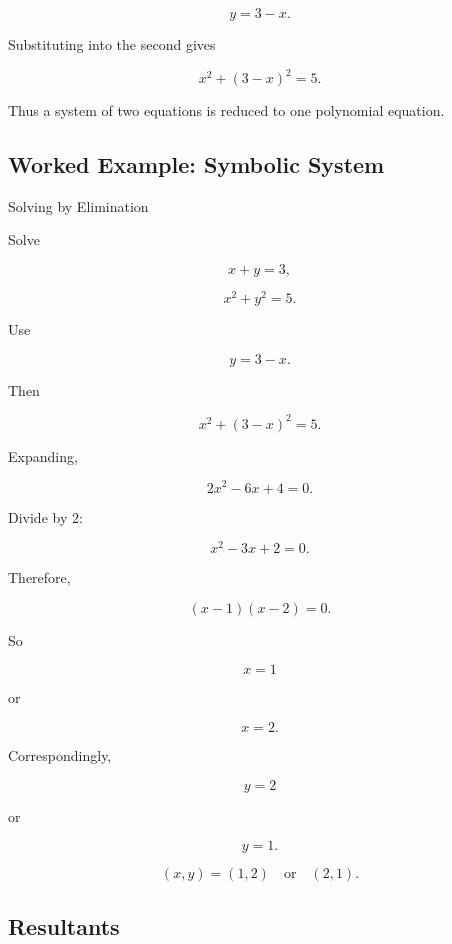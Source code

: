 \[
y=3-x.
\]

Substituting into the second gives

\[
x^2+(3-x)^2=5.
\]

Thus a system of two equations is reduced to one polynomial equation.

\subsection{Worked Example: Symbolic System}
\label{subsec:worked-symbolic-system}

\begin{workedexamplebox}{Solving by Elimination}

Solve

\[
x+y=3,
\]

\[
x^2+y^2=5.
\]

Use

\[
y=3-x.
\]

Then

\[
x^2+(3-x)^2=5.
\]

Expanding,

\[
2x^2-6x+4=0.
\]

Divide by \(2\):

\[
x^2-3x+2=0.
\]

Therefore,

\[
(x-1)(x-2)=0.
\]

So

\[
x=1
\]

or

\[
x=2.
\]

Correspondingly,

\[
y=2
\]

or

\[
y=1.
\]

\begin{answerbox}
\[
\boxed{
(x,y)
=
(1,2)
\quad
\text{or}
\quad
(2,1).
}
\]
\end{answerbox}

\end{workedexamplebox}

\subsection{Resultants}
\label{subsec:symbolic-resultants}

